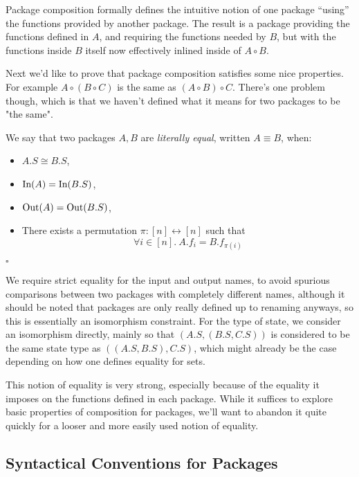 Package composition formally defines the intuitive notion of one package
``using'' the functions provided by another package.
The result is a package providing the functions defined in $A$,
and requiring the functions needed by $B$, but with the functions
inside $B$ itself now effectively inlined inside of $A \circ B$.

Next we'd like to prove that package composition satisfies some nice
properties.
For example $A \circ (B \circ C)$ is the same as $(A \circ B) \circ C$.
There's one problem though, which is that we haven't defined
what it means for two packages to be "the same".

\begin{definition}
    We say that two packages $A, B$ are \emph{literally equal},
    written $A \equiv B$, when:
    \begin{itemize}
        \item $A.S \cong B.S$,
        \item $\text{In}(A) = \text{In}(B.S)$,
        \item $\text{Out}(A) = \text{Out}(B.S)$,
        \item There exists a permutation $\pi : [n] \leftrightarrow [n]$ such that
        $$\forall i \in [n].\ A.f_i = B.f_{\pi(i)}$$
    \end{itemize}

    $\square$
\end{definition}

We require strict equality for the input and output names,
to avoid spurious comparisons between two packages with completely different names,
although it should be noted that packages are only really defined up to renaming anyways,
so this is essentially an isomorphism constraint.
For the type of state, we consider an isomorphism directly,
mainly so that $(A.S, (B.S, C.S))$ is considered to be the same state
type as $((A.S, B.S), C.S)$, which might already be the case depending on
how one defines equality for sets.

This notion of equality is very strong, especially because of the equality
it imposes on the functions defined in each package.
While it suffices to explore basic properties of composition for packages,
we'll want to abandon it quite quickly for a looser and more easily
used notion of equality.

\subsection{Syntactical Conventions for Packages}